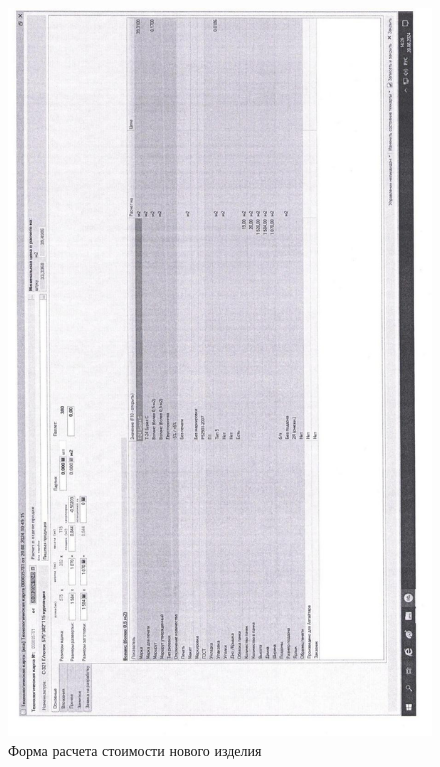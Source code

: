 %
%
\begin{figure}
\begin{center}
  \includegraphics[width=\linewidth, height=0.94\textheight, keepaspectratio]{Pics/d04.jpg}
\end{center}
  \caption{Форма расчета стоимости нового изделия}
  \label{pic:d04}
\end{figure}
\clearpage
%
%
